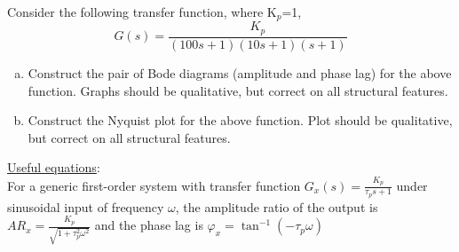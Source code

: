 \documentclass[calculator,datasheet]{exam}
\newcommand{\frc}{\displaystyle\frac}
\begin{document}
\clearpage

\begin{question}
%
Consider the following transfer function, where K$_{p}$=1,
\begin{displaymath}
G(s) = \frc{K_{p}}{(100s+1)(10s+1)(s+1)}
\end{displaymath}
\begin{enumerate}[(a)]
\item Construct the pair of Bode diagrams (amplitude and phase lag) for the above function. Graphs should be qualitative, but correct on all structural features.~

\item Construct the Nyquist plot for the above function. Plot should be qualitative, but correct on all structural features.~
\end{enumerate} 

\underline{Useful equations}:\\
	For a generic first-order system with transfer function $G_{x}(s)=\frc{K_{p}}{\tau_{p}s+1}$ under sinusoidal input of frequency $\omega$, the amplitude ratio of the output is $AR_{x}=\frc{K_{p}}{\sqrt{1+\tau_{p}^{2}\omega^{2}}}$ and the phase lag is $\varphi_{x}=\tan^{-1}\left(-\tau_{p}\omega\right)$


%
\end{question}

\clearpage
\end{document}
